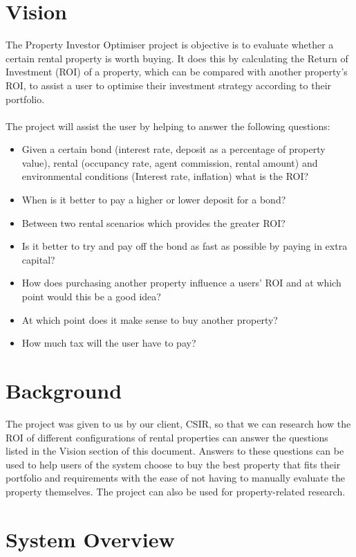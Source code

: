 \documentclass[a4paper,12pt]{article}
\begin{document}
\section{Vision}
The Property Investor Optimiser project is objective is to evaluate whether a certain rental property is worth buying. It does this by calculating the Return of Investment (ROI) of a property, which can be compared with another property's ROI, to assist a user to optimise their investment strategy according to their portfolio.\\\\
The project will assist the user by helping to answer the following questions:\begin{itemize}
	\item Given a certain bond (interest rate, deposit as a percentage of property value), rental (occupancy rate, agent commission, rental amount) and environmental conditions (Interest rate, inflation) what is the ROI?
	\item When is it better to pay a higher or lower deposit for a bond?
	\item Between two rental scenarios which provides the greater ROI?
	\item Is it better to try and pay off the bond as fast as possible by paying in extra capital?
	\item How does purchasing another property influence a users’ ROI and at which point would this be a good idea?
	\item At which point does it make sense to buy another property?
	\item How much tax will the user have to pay?

\end{itemize}

\section{Background}
The project was given to us by our client, CSIR, so that we can research how the ROI of different configurations of rental properties can answer the questions listed in the Vision section of this document. Answers to these questions can be used to help users of the system choose to buy the best property that fits their portfolio and requirements with the ease of not having to manually evaluate the property themselves. The project can also be used for property-related research.


\section{System Overview}
\end{document}
